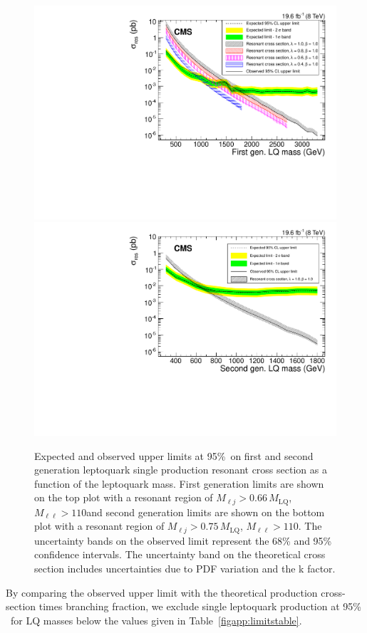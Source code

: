 \begin{figure}[!htbp]
       \centering
       {\includegraphics[width=.75\textwidth]{Figures/Figures_ee_FiducialLimits_UEExclusion_1p0.pdf}}
       {\includegraphics[width=.75\textwidth]{Figures/Figures_mumu_FiducialLimits_Mu_Exclusion.pdf}}
       \caption{Expected and observed upper limits at 95\%~\CL on first and second generation leptoquark single production resonant cross section as a function of the leptoquark mass.  First generation limits are shown on the top plot with a resonant region of $M_{\ell j} > 0.66 \, M_{\text{LQ}}$, $M_{\ell \ell}> 110$\GeV and second generation limits are shown on the bottom plot with a resonant region of $M_{\ell j} > 0.75 \, M_{\text{LQ}}$, $M_{\ell \ell}> 110$\GeV.  The uncertainty bands on the observed limit represent the 68\% and 95\% confidence intervals.  The uncertainty band on the theoretical cross section includes uncertainties due to PDF variation and the k factor.\label{figapp:combinedlims}}
\end{figure}

By comparing the observed upper limit with the theoretical production cross-section times branching fraction, we exclude single leptoquark production at 95\% ~\CL for LQ masses below the values given in Table~\ref{figapp:limitstable}.

